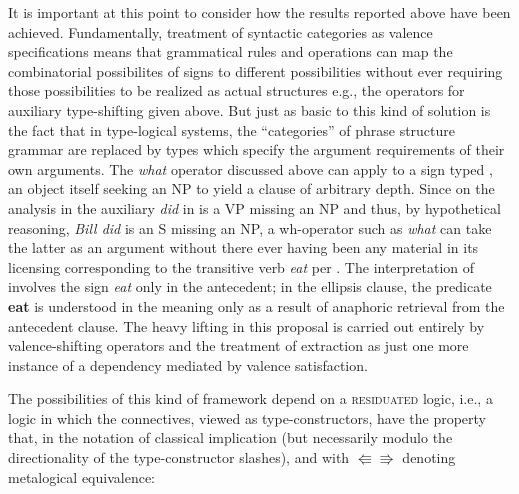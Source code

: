 \documentclass[output=paper,colorlinks,citecolor=brown]{langscibook}
\begin{document}
It is important at this point to consider how the results reported
above have been achieved. Fundamentally, treatment of syntactic
categories as valence specifications means that grammatical
rules and operations can map the combinatorial possibilites of signs
to different possibilities without ever requiring those possibilities
to be realized as actual structures e.g., the operators for auxiliary
type-shifting given above. But just as basic to this kind of solution
is the fact that in type-logical systems, the ``categories'' of phrase
structure grammar are replaced by types which specify the argument
requirements of their own arguments. The \textit{what} operator discussed
above can apply to a sign typed , an object itself seeking an NP
to yield a clause of arbitrary depth. Since on the analysis in
 the auxiliary \textit{did} in  is a VP
missing an NP and thus, by hypothetical reasoning, \textit{Bill did} is an S
missing an NP, a wh-operator such as \textit{what} can take the latter as
an argument without there ever having been any material in its
licensing corresponding to the transitive verb \textit{eat} per
. The interpretation of  involves
the sign \textit{eat} only in the antecedent; in the ellipsis clause, the
predicate \textbf{eat} is understood in the meaning only as a result of
anaphoric retrieval from the antecedent clause. The heavy lifting in
this proposal is carried out entirely by valence-shifting operators
and the treatment of extraction as just one more instance of a
dependency mediated by valence satisfaction.

The possibilities of this kind of framework depend on a \textsc{residuated}
logic, i.e., a logic in which the connectives, viewed as
type-constructors, have the property that, in the notation of
classical implication (but necessarily modulo the directionality of the
type-constructor slashes), and with $\Lleftarrow\!\Rrightarrow$
denoting metalogical equivalence:
\end{document}

